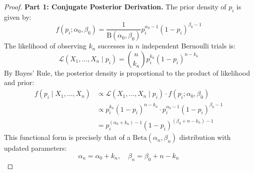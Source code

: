 \begin{proof}
\textbf{Part 1: Conjugate Posterior Derivation.}
The prior density of $p_i$ is given by:
\begin{equation}
    f(p_i; \alpha_0, \beta_0) = \frac{1}{\text{B}(\alpha_0, \beta_0)} p_i^{\alpha_0 - 1} (1 - p_i)^{\beta_0 - 1}
\end{equation}
The likelihood of observing $k_n$ successes in $n$ independent Bernoulli trials is:
\begin{equation}
    \mathcal{L}(X_1, \dots, X_n \mid p_i) = \binom{n}{k_n} p_i^{k_n} (1 - p_i)^{n - k_n}
\end{equation}
By Bayes' Rule, the posterior density is proportional to the product of likelihood and prior:
\begin{equation}
    \begin{aligned}
        f(p_i \mid X_1, \dots, X_n) &\propto \mathcal{L}(X_1, \dots, X_n \mid p_i) \cdot f(p_i; \alpha_0, \beta_0) \\
        &\propto p_i^{k_n} (1 - p_i)^{n - k_n} \cdot p_i^{\alpha_0 - 1} (1 - p_i)^{\beta_0 - 1} \\
        &= p_i^{(\alpha_0 + k_n) - 1} (1 - p_i)^{(\beta_0 + n - k_n) - 1}
    \end{aligned}
\end{equation}
This functional form is precisely that of a $\text{Beta}(\alpha_n, \beta_n)$ distribution with updated parameters:
\begin{equation}
    \alpha_n = \alpha_0 + k_n, \quad \beta_n = \beta_0 + n - k_n
\end{equation}


\end{proof}
